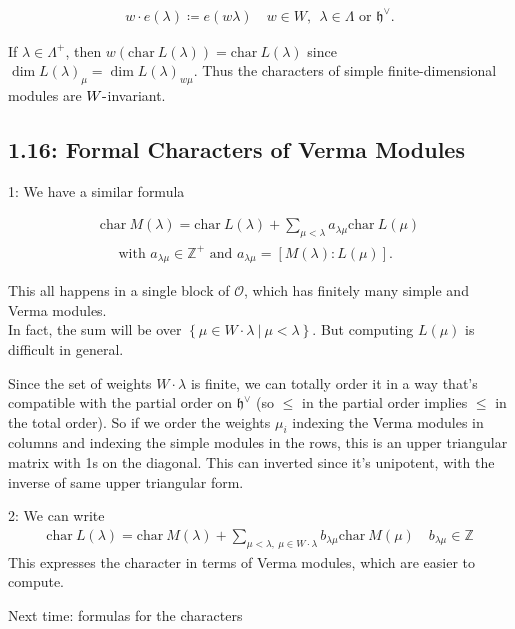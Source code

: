 \documentclass[11pt]{scrartcl}
\theoremstyle{definition}
\theoremstyle{theorem}
\theoremstyle{proof}
\theoremstyle{definition}
\theoremstyle{break}
\theoremstyle{problem}
\newcommand{\ZZ}[0]{{\mathbb{Z}}}
\newcommand{\ch}[0]{\mathrm{char}~}
\newcommand{\dash}[0]{{\hbox{-}}}
\newcommand{\definedas}[0]{\coloneqq}
\newcommand{\dual}[0]{^\vee}
\newcommand{\lieh}[0]{{\mathfrak{h}}}
\newcommand{\OO}[0]{{\mathcal{O}}}
\newcommand{\suchthat}[0]{{~\mathrel{\Big|}~}}
\newcommand{\theset}[1]{\left\{{#1}\right\}}
\begin{document}
\begin{align*}
w\cdot e(\lambda) \definedas e(w\lambda) \quad w\in W,~~\lambda \in \Lambda \text{ or } \lieh\dual
.\end{align*}

If \(\lambda \in \Lambda^+\), then
\(w( \ch L(\lambda) ) = \ch L(\lambda)\) since
\(\dim L(\lambda)_\mu = \dim L(\lambda)_{w\mu}\). Thus the characters of
simple finite-dimensional modules are \(W\dash\)invariant.

\hypertarget{formal-characters-of-verma-modules}{%
\subsection{1.16: Formal Characters of Verma
Modules}\label{formal-characters-of-verma-modules}}

1: We have a similar formula

\begin{align*}
\ch M(\lambda) = \ch L(\lambda) + \sum_{\mu < \lambda} a_{\lambda \mu} \ch L(\mu) \\
\quad \text{ with } a_{\lambda \mu} \in \ZZ^+ 
\text{ and } a_{\lambda \mu} = [M(\lambda): L(\mu)]
.\end{align*}

This all happens in a single block of \(\OO\), which has finitely many
simple and Verma modules.\\
In fact, the sum will be over
\(\theset{ \mu \in W\cdot \lambda \suchthat \mu < \lambda}\). But
computing \(L(\mu)\) is difficult in general.

Since the set of weights \(W\cdot \lambda\) is finite, we can totally
order it in a way that's compatible with the partial order on
\(\lieh\dual\) (so \(\leq\) in the partial order implies \(\leq\) in the
total order). So if we order the weights \(\mu_i\) indexing the Verma
modules in columns and indexing the simple modules in the rows, this is
an upper triangular matrix with 1s on the diagonal. This can inverted
since it's unipotent, with the inverse of same upper triangular form.

2: We can write
\begin{align*}
\ch L(\lambda) 
= \ch M(\lambda) + 
\sum_{\mu < \lambda,~\mu \in W\cdot \lambda} b_{\lambda \mu} \ch M(\mu) \quad b_{\lambda \mu} \in \ZZ
\end{align*} This expresses the character in terms of Verma modules,
which are easier to compute.

Next time: formulas for the characters
\end{document}

